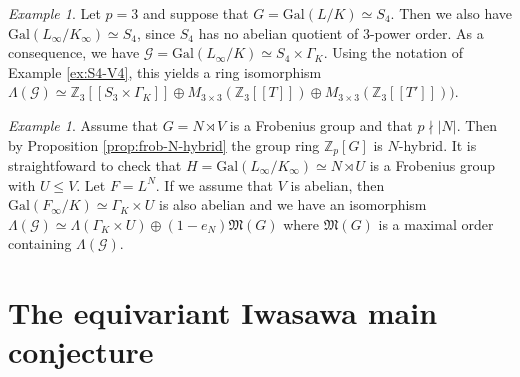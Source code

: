 \documentclass[12pt]{amsart}
\theoremstyle{plain}
\theoremstyle{remark}
\newtheorem{example}[theorem]{Example}
\theoremstyle{definition}
\numberwithin{equation}{section}
\begin{document}
\begin{example} \label{ex:S4-V4-II}
Let $p=3$ and suppose that $G = {\mathrm{Gal}}(L/K) \simeq S_{4}$.
Then we also have ${\mathrm{Gal}}(L_{\infty}/K_{\infty}) \simeq S_{4}$, since $S_{4}$ has no abelian quotient of $3$-power order.
As a consequence, we have $\mathcal{G} = {\mathrm{Gal}}(L_{\infty}/K) \simeq S_{4} \times \Gamma_K$.
Using the notation of Example \ref{ex:S4-V4}, this yields a ring isomorphism
$\Lambda(\mathcal{G}) \simeq {\mathbb{Z}}_{3}[[S_{3} \times \Gamma_{K}]]
\oplus M_{3 \times 3}({\mathbb{Z}}_{3}[[T]]) \oplus  M_{3 \times 3}({\mathbb{Z}}_{3}[[T']]))$.
\end{example}

\begin{example}
Assume that $G = N \rtimes V$ is a Frobenius group and that $p \nmid |N|$.
Then by Proposition \ref{prop:frob-N-hybrid} the group ring ${\mathbb{Z}}_{p}[G]$ is $N$-hybrid.
It is straightfoward to check that $H = {\mathrm{Gal}}(L_{\infty}/K_{\infty}) \simeq N \rtimes U$ is a Frobenius group with $U \leq V$.
Let $F = L^{N}$.
If we assume that $V$ is abelian, then ${\mathrm{Gal}}(F_{\infty}/K) \simeq \Gamma_K \times U$ is also abelian
and we have an isomorphism
$\Lambda(\mathcal{G}) \simeq \Lambda(\Gamma_{K} \times U) \oplus (1-e_{N}) \mathfrak{M}(G)$
where $\mathfrak{M}(G)$ is a maximal order containing $\Lambda(\mathcal{G})$.
\end{example}

\section{The equivariant Iwasawa main conjecture} \label{sec:EIMC}
\end{document}
